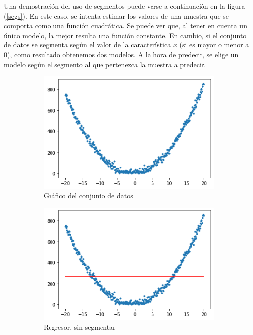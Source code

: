         Una demostración del uso de segmentos puede verse a continuación en la figura (\ref{segs}). En este caso, se intenta estimar los valores de una muestra que se comporta como una función cuadrática. Se puede ver que, al tener en cuenta un único modelo, la mejor resulta una función constante. En cambio, si el conjunto de datos se segmenta según el valor de la característica $x$ (si es mayor o menor a 0), como resultado obtenemos dos modelos. A la hora de predecir, se elige un modelo según el segmento al que pertenezca la muestra a predecir.
        
        
    \begin{figure}[H]
    \centering
        \begin{subfigure}{.3\textwidth}
            \centering
            \includegraphics[scale=.35]{img/explicaciones/1_seg.png}
            \caption{Gráfico del conjunto de datos}
        \end{subfigure}
        \begin{subfigure}{.3\textwidth}
            \centering
            \includegraphics[scale=.35]{img/explicaciones/2_seg.png}
            \caption{Regresor, sin segmentar}
        \end{subfigure}
        \begin{subfigure}{.3\textwidth}

\end{subfigure}
\end{figure}
